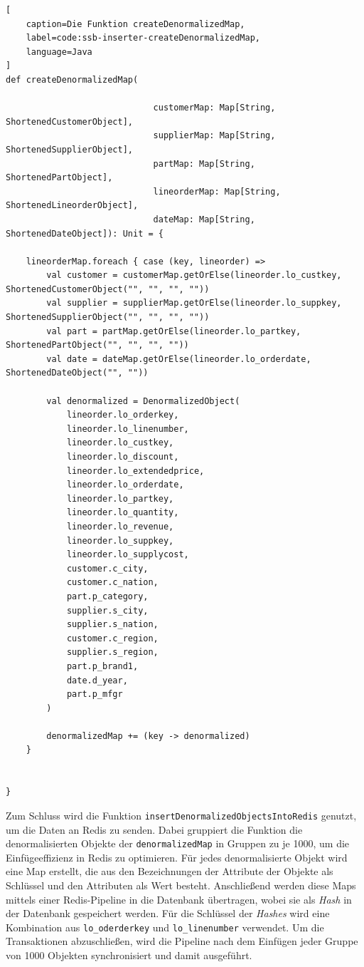 \begin{lstlisting}[
    caption=Die Funktion createDenormalizedMap,
    label=code:ssb-inserter-createDenormalizedMap,
    language=Java
]
def createDenormalizedMap(

							 customerMap: Map[String, ShortenedCustomerObject],
							 supplierMap: Map[String, ShortenedSupplierObject],
							 partMap: Map[String, ShortenedPartObject],
							 lineorderMap: Map[String, ShortenedLineorderObject],
							 dateMap: Map[String, ShortenedDateObject]): Unit = {

	lineorderMap.foreach { case (key, lineorder) =>
		val customer = customerMap.getOrElse(lineorder.lo_custkey, ShortenedCustomerObject("", "", "", ""))
		val supplier = supplierMap.getOrElse(lineorder.lo_suppkey, ShortenedSupplierObject("", "", "", ""))
		val part = partMap.getOrElse(lineorder.lo_partkey, ShortenedPartObject("", "", "", ""))
		val date = dateMap.getOrElse(lineorder.lo_orderdate, ShortenedDateObject("", ""))

		val denormalized = DenormalizedObject(
			lineorder.lo_orderkey,
			lineorder.lo_linenumber,
			lineorder.lo_custkey,
			lineorder.lo_discount,
			lineorder.lo_extendedprice,
			lineorder.lo_orderdate,
			lineorder.lo_partkey,
			lineorder.lo_quantity,
			lineorder.lo_revenue,
			lineorder.lo_suppkey,
			lineorder.lo_supplycost,
			customer.c_city,
			customer.c_nation,
			part.p_category,
			supplier.s_city,
			supplier.s_nation,
			customer.c_region,
			supplier.s_region,
			part.p_brand1,
			date.d_year,
			part.p_mfgr
		)

		denormalizedMap += (key -> denormalized)
	}


}
\end{lstlisting}


Zum Schluss wird die Funktion \lstinline|insertDenormalizedObjectsIntoRedis| genutzt, um die Daten an Redis zu senden.
Dabei gruppiert die Funktion die denormalisierten Objekte der \lstinline|denormalizedMap| in Gruppen zu je 1000, um die Einfügeeffizienz in Redis zu optimieren. Für jedes denormalisierte Objekt wird eine Map erstellt, die aus den Bezeichnungen der Attribute der Objekte als Schlüssel und den Attributen als Wert besteht. Anschließend werden diese Maps mittels einer Redis-Pipeline in die Datenbank übertragen, wobei sie als \emph{Hash} in der Datenbank gespeichert werden. Für die Schlüssel der \emph{Hashes} wird eine Kombination aus \lstinline|lo_oderderkey| und \lstinline|lo_linenumber| verwendet. Um die Transaktionen abzuschließen, wird die Pipeline nach dem Einfügen jeder Gruppe von 1000 Objekten synchronisiert und damit ausgeführt.

